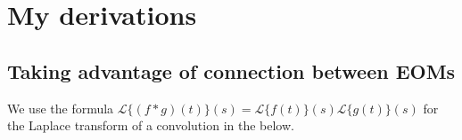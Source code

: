 


\section{My derivations}
\subsection{Taking advantage of connection between EOMs}
We use the formula $\mathcal{L}\{(f*g)(t)\}(s)=\mathcal{L}\{f(t)\}(s) \mathcal{L}\{g(t)\}(s)$ for the Laplace transform of a convolution in the below.
